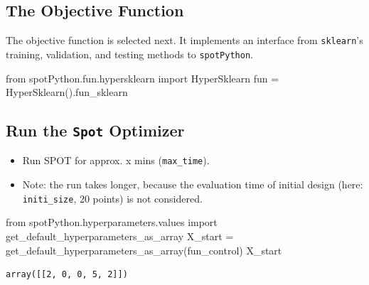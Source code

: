 \documentclass[
  letterpaper,
  DIV=11,
  numbers=noendperiod]{scrreprt}
\newenvironment{Shaded}{\begin{snugshade}}{\end{snugshade}}
\newcommand{\ImportTok}[1]{\textcolor[rgb]{0.00,0.46,0.62}{#1}}
\newcommand{\NormalTok}[1]{\textcolor[rgb]{0.00,0.23,0.31}{#1}}
\newcommand{\OperatorTok}[1]{\textcolor[rgb]{0.37,0.37,0.37}{#1}}
\providecommand{\tightlist}{%
  \setlength{\itemsep}{0pt}\setlength{\parskip}{0pt}}\usepackage{longtable,booktabs,array}
\begin{document}
\hypertarget{sec-the-objective-function-19}{%
\subsection{The Objective
Function}\label{sec-the-objective-function-19}}

The objective function is selected next. It implements an interface from
\texttt{sklearn}'s training, validation, and testing methods to
\texttt{spotPython}.

\begin{Shaded}
\begin{Highlighting}[]
\ImportTok{from}\NormalTok{ spotPython.fun.hypersklearn }\ImportTok{import}\NormalTok{ HyperSklearn}
\NormalTok{fun }\OperatorTok{=}\NormalTok{ HyperSklearn().fun\_sklearn}
\end{Highlighting}
\end{Shaded}

\hypertarget{run-the-spot-optimizer-5}{%
\subsection{\texorpdfstring{Run the \texttt{Spot}
Optimizer}{Run the Spot Optimizer}}\label{run-the-spot-optimizer-5}}

\begin{itemize}
\tightlist
\item
  Run SPOT for approx. x mins (\texttt{max\_time}).
\item
  Note: the run takes longer, because the evaluation time of initial
  design (here: \texttt{initi\_size}, 20 points) is not considered.
\end{itemize}

\begin{Shaded}
\begin{Highlighting}[]
\ImportTok{from}\NormalTok{ spotPython.hyperparameters.values }\ImportTok{import}\NormalTok{ get\_default\_hyperparameters\_as\_array}
\NormalTok{X\_start }\OperatorTok{=}\NormalTok{ get\_default\_hyperparameters\_as\_array(fun\_control)}
\NormalTok{X\_start}
\end{Highlighting}
\end{Shaded}

\begin{verbatim}
array([[2, 0, 0, 5, 2]])
\end{verbatim}
\end{document}
